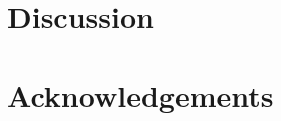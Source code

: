 \documentclass[useAMS,usenatbib]{mn2e}
\begin{document}
\section{Discussion} 
\section{Acknowledgements}


%



\label{lastpage}
\end{document}
